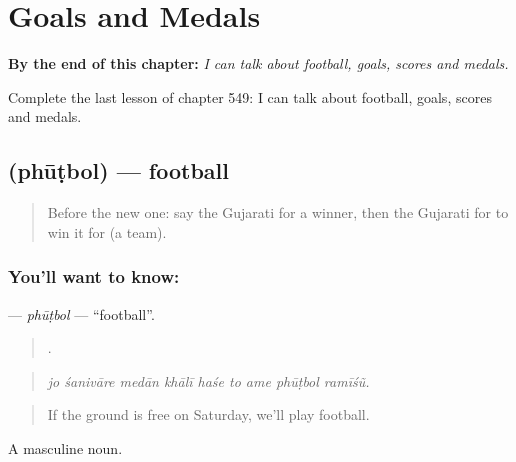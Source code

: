 
\chapter{Goals and Medals}
\label{ch:gu-goals-and-medals}

\begin{chapteropening}
\textbf{By the end of this chapter:} \emph{I can talk about football, goals, scores and medals.}

Complete the last lesson of chapter 549: I can talk about football, goals, scores and medals.
\end{chapteropening}

\section[\texorpdfstring{\gu{ફૂટબોલ} (phūṭbol)}{ફૂટબોલ (phūṭbol)}]{ (phūṭbol) — football}

\label{lesson:GU-C549-phutbol}



\begin{quote}
Before the new one: say the Gujarati for a winner, then the Gujarati for to win it for (a team).
\end{quote}

\subsection*{You'll want to know: }
\textbf{} — \emph{phūṭbol} — \textquotedblleft{}football\textquotedblright{}.

\begin{quote}
        .
\end{quote}

\begin{quote}
\emph{jo śanivāre medān khālī haśe to ame phūṭbol ramīśũ.}
\end{quote}

\begin{quote}
If the ground is free on Saturday, we'll play football.
\end{quote}

A masculine noun.


